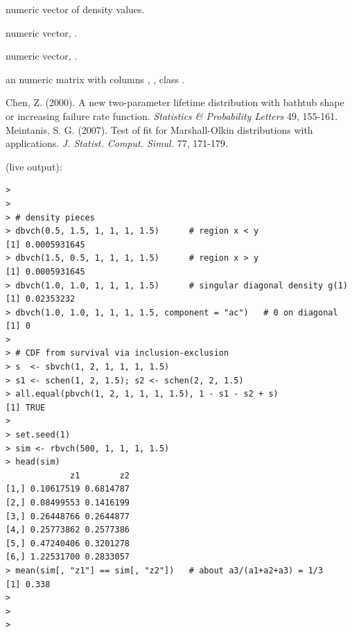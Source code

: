\documentclass[11pt,a4paper]{article}
\begin{document}
%
\begin{Value}
\begin{ldescription}
\item[\code{dbvch}] numeric vector of density values.
\item[\code{pbvch}] numeric vector, .
\item[\code{sbvch}] numeric vector, .
\item[\code{rbvch}] an  numeric matrix with columns
, , class .
\end{ldescription}
\end{Value}
%
\begin{References}
Chen, Z. (2000). A new two-parameter lifetime distribution with
bathtub shape or increasing failure rate function.
\emph{Statistics \& Probability Letters} 49, 155-161.
Meintanis, S. G. (2007). Test of fit for Marshall-Olkin
distributions with applications. \emph{J. Statist. Comput. Simul.}
77, 171-179.
\end{References}
%


\vspace{0.8em}
 (live output):
\begin{lstlisting}
> 
> 
> # density pieces
> dbvch(0.5, 1.5, 1, 1, 1, 1.5)      # region x < y
[1] 0.0005931645
> dbvch(1.5, 0.5, 1, 1, 1, 1.5)      # region x > y
[1] 0.0005931645
> dbvch(1.0, 1.0, 1, 1, 1, 1.5)      # singular diagonal density g(1)
[1] 0.02353232
> dbvch(1.0, 1.0, 1, 1, 1, 1.5, component = "ac")   # 0 on diagonal
[1] 0
> 
> # CDF from survival via inclusion-exclusion
> s  <- sbvch(1, 2, 1, 1, 1, 1.5)
> s1 <- schen(1, 2, 1.5); s2 <- schen(2, 2, 1.5)
> all.equal(pbvch(1, 2, 1, 1, 1, 1.5), 1 - s1 - s2 + s)
[1] TRUE
> 
> set.seed(1)
> sim <- rbvch(500, 1, 1, 1, 1.5)
> head(sim)
             z1        z2
[1,] 0.10617519 0.6814787
[2,] 0.08499553 0.1416199
[3,] 0.26448766 0.2644877
[4,] 0.25773862 0.2577386
[5,] 0.47240406 0.3201278
[6,] 1.22531700 0.2833057
> mean(sim[, "z1"] == sim[, "z2"])   # about a3/(a1+a2+a3) = 1/3
[1] 0.338
> 
> 
> 
\end{lstlisting}


\newpage
\end{document}
